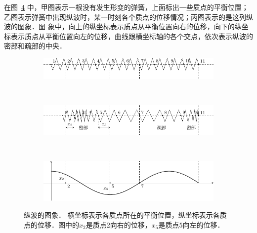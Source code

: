在图~\ref{fig_A_9-19} 中，甲图表示一根没有发生形变的弹簧，上面标出一些质点的平衡位置；乙图表示弹簧中出现纵波时，某一时刻各个质点的位移情况；丙图表示的是这列纵波的图象．图
象中，向上的纵坐标表示质点从平衡位置向右的位移，向下的纵坐标表示质点从平衡位置向左的位移，曲线跟横坐标轴的各个交点，依次表示纵波的密部和疏部的中央．


\begin{figure}[htbp]
    \centering
    \begin{subfigure}{0.8\linewidth}
        \centering
        \includegraphics{fig/A/9-19a.pdf}
        \caption{}\label{fig_A_9-19a}
    \end{subfigure}
    \\
    \begin{subfigure}{0.8\linewidth}
        \centering
        \includegraphics{fig/A/9-19b.pdf}
        \caption{}\label{fig_A_9-19b}
    \end{subfigure}
    \\
    \begin{subfigure}{0.8\linewidth}
        \centering
        \includegraphics{fig/A/9-19c.pdf}
        \caption{}\label{fig_A_9-19c}
    \end{subfigure}
    \caption{纵波的图象．
    横坐标表示各质点所在的平衡位置，纵坐标表示各质点的位移．图中的$x_2$是质点$2$向右的位移，$x_5$是质点$5$向左的位移．}\label{fig_A_9-19}
\end{figure}



